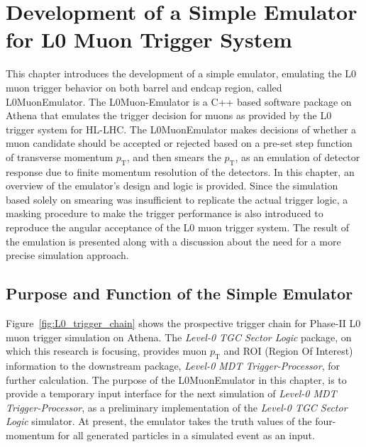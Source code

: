 \chapter{Development of a Simple Emulator for L0 Muon Trigger System} \label{ch:L0MuonEmulator}
This chapter introduces the development of a simple emulator, emulating the L0 muon trigger behavior on both barrel and endcap region, called L0MuonEmulator. The L0Muon-Emulator is a C++ based software package on Athena that emulates the trigger decision for muons as provided by the L0 trigger system for HL-LHC. The L0MuonEmulator makes decisions of whether a muon candidate should be accepted or rejected based on a pre-set step function of transverse momentum $p_\mathrm{T}$, and then smears the $p_\mathrm{T}$, as an emulation of detector response due to finite momentum resolution of the detectors. In this chapter, an overview of the emulator's design and logic is provided. Since the simulation based solely on smearing was insufficient to replicate the actual trigger logic, a masking procedure to make the trigger performance is also introduced to reproduce the angular acceptance of the L0 muon trigger system. The result of the emulation is presented along with a discussion about the need for a more precise simulation approach.
\section{Purpose and Function of the Simple Emulator} \label{sec:L0MuonPurpose}
Figure~\ref{fig:L0_trigger_chain} shows the prospective trigger chain for Phase-II L0 muon trigger simulation on Athena. The \textit{Level-0 TGC Sector Logic} package, on which this research is focusing, provides muon $p_\mathrm{T}$ and ROI (Region Of Interest) information to the downstream package, \textit{Level-0 MDT Trigger-Processor}, for further calculation. The purpose of the L0MuonEmulator in this chapter, is to provide a temporary input interface for the next simulation of \textit{Level-0 MDT Trigger-Processor}, as a preliminary implementation of the \textit{Level-0 TGC Sector Logic} simulator. At present, the emulator takes the truth values of the four-momentum for all generated particles in a simulated event as an input. 

